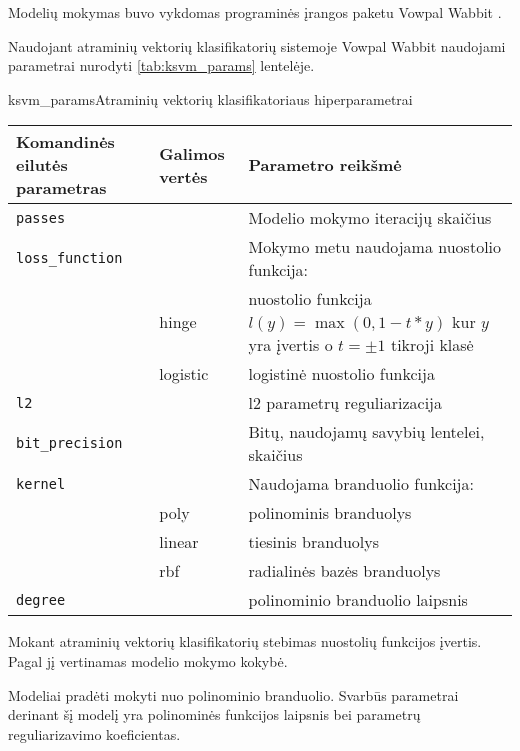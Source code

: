 
Modelių mokymas buvo vykdomas programinės įrangos paketu Vowpal Wabbit \cite{vw}.


Naudojant atraminių vektorių klasifikatorių sistemoje Vowpal Wabbit naudojami parametrai nurodyti \vref{tab:ksvm_params} lentelėje.

\begin{ktutable}{ksvm_params}{Atraminių vektorių klasifikatoriaus hiperparametrai}
    \begin{tabular}{| l | l | p{7cm}|}
    \hline
        Komandinės eilutės parametras & Galimos vertės & Parametro reikšmė\\ \hline
        \texttt{passes} &  & Modelio mokymo iteracijų skaičius \\ \hline
        \texttt{loss\_function} &          & Mokymo metu naudojama nuostolio funkcija: \\
                               & hinge    & nuostolio funkcija $l(y) = \max(0, 1 - t * y)$ kur $y$ yra įvertis o $t = \pm 1$ tikroji klasė  \\
                               & logistic & logistinė nuostolio funkcija \\ \hline
        \texttt{l2} & & l2 parametrų reguliarizacija \\ \hline
        \texttt{bit\_precision} & & Bitų, naudojamų savybių lentelei, skaičius\\ \hline
        \texttt{kernel} & & Naudojama branduolio funkcija:   \\
                       & poly & polinominis branduolys     \\
                       & linear & tiesinis branduolys      \\
                       & rbf & radialinės bazės branduolys \\ \hline
        \texttt{degree} & & polinominio branduolio laipsnis \\ \hline
    \end{tabular}
\end{ktutable}

Mokant atraminių vektorių klasifikatorių stebimas nuostolių funkcijos įvertis. Pagal jį
vertinamas modelio mokymo kokybė.

Modeliai pradėti mokyti nuo polinominio branduolio. Svarbūs parametrai derinant šį modelį yra polinominės
funkcijos laipsnis bei parametrų reguliarizavimo koeficientas.

